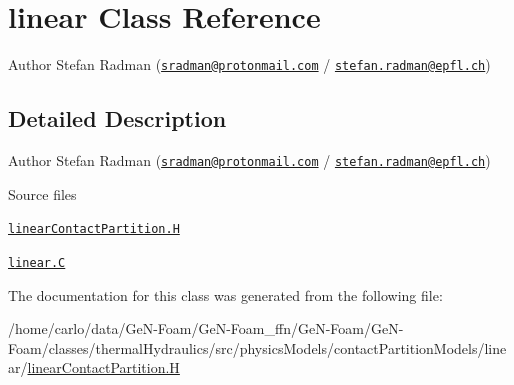 \hypertarget{classFoam_1_1linear}{}\section{linear Class Reference}
\label{classFoam_1_1linear}


Author Stefan Radman (\href{mailto:sradman@protonmail.com}{\tt sradman@protonmail.\+com} / \href{mailto:stefan.radman@epfl.ch}{\tt stefan.\+radman@epfl.\+ch})  




\subsection{Detailed Description}
Author Stefan Radman (\href{mailto:sradman@protonmail.com}{\tt sradman@protonmail.\+com} / \href{mailto:stefan.radman@epfl.ch}{\tt stefan.\+radman@epfl.\+ch}) 

\label{_Description}%
 \begin{DoxyParagraph}{Source files}

\begin{DoxyItemize}
\item \href{../../../home/carlo/data/GeN-Foam/GeN-Foam_ffn/GeN-Foam/GeN-Foam/classes/thermalHydraulics/src/physicsModels/contactPartitionModels/linear/linearContactPartition.H}{\tt linear\+Contact\+Partition.\+H} 
\item \href{../../../home/carlo/data/GeN-Foam/GeN-Foam_ffn/GeN-Foam/GeN-Foam/classes/thermalHydraulics/src/physicsModels/contactPartitionModels/linear/linear.C}{\tt linear.\+C} 
\end{DoxyItemize}
\end{DoxyParagraph}


The documentation for this class was generated from the following file\+:\begin{DoxyCompactItemize}
\item 
/home/carlo/data/\+Ge\+N-\/\+Foam/\+Ge\+N-\/\+Foam\+\_\+ffn/\+Ge\+N-\/\+Foam/\+Ge\+N-\/\+Foam/classes/thermal\+Hydraulics/src/physics\+Models/contact\+Partition\+Models/linear/\hyperlink{linearContactPartition_8H}{linear\+Contact\+Partition.\+H}\end{DoxyCompactItemize}
